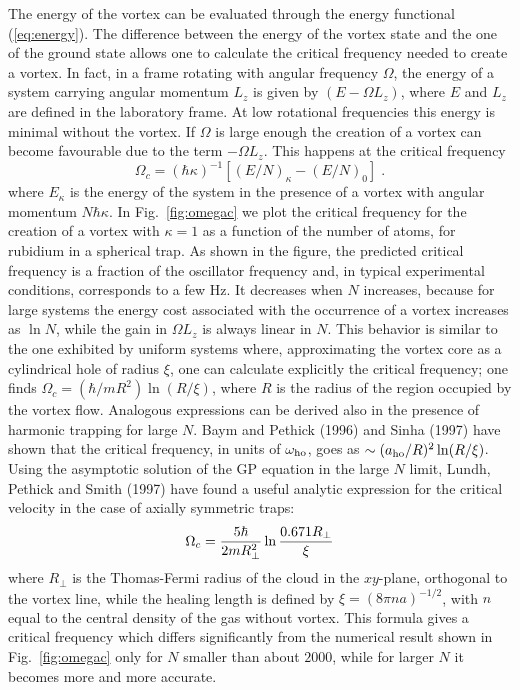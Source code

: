 The energy of the vortex can be evaluated through the energy functional
(\ref{eq:energy}). The difference between the energy of the vortex state
and the one of the ground state allows one to calculate the critical
frequency needed to create a vortex. In fact, in a frame rotating with
angular frequency $\Omega$, the energy of a system carrying angular
momentum $L_z$ is given by $(E-\Omega L_z)$, where $E$ and $L_z$ are
defined in the laboratory frame. At low rotational frequencies this
energy is minimal without the vortex. If $\Omega$ is large enough the
creation of a vortex can become favourable due to the term  $-\Omega L_z$.
This happens at the critical frequency
\begin{equation}
\Omega_c = (\hbar\kappa)^{-1} [(E/N)_{\kappa}-(E/N)_0] \;.
\label{eq:vorcf}
\end{equation}
where $E_{\kappa}$ is the energy of the system in the presence of a
vortex with angular momentum $N\hbar{\kappa}$. In Fig.~\ref{fig:omegac}
we plot the critical frequency for the creation of a vortex with 
$\kappa=1$ as a function of the number of atoms, for rubidium in
a spherical trap. As shown in the figure, the predicted critical 
frequency is a fraction of the oscillator frequency and, in typical 
experimental conditions, corresponds to a few Hz. It decreases when 
$N$ increases, because for large systems the energy cost associated 
with the occurrence of a vortex increases as $\ln N$, while the gain 
in $\Omega L_z$ is always linear in $N$. This behavior is similar 
to the one exhibited by uniform systems where, approximating  the 
vortex core  as a cylindrical hole of radius  $\xi$, one can  
calculate explicitly the critical frequency; one finds
$\Omega_c = (\hbar/mR^2)\ln (R/\xi)$, where $R$ is the radius of the
region occupied by the vortex flow. Analogous expressions can be derived 
also in the presence of harmonic trapping for large $N$.
Baym and Pethick (1996) and Sinha (1997) have shown that the critical
frequency, in units of $\omega_{\rm ho}$, goes as $\sim (a_{\rm ho}/R)^2
\ln(R/\xi)$. Using the asymptotic solution of the GP equation in the
large $N$ limit, Lundh, Pethick and Smith (1997) have found a useful 
analytic expression for the critical velocity in the case of axially 
symmetric traps:
\begin{equation}
\Omega_c = {5 \hbar \over 2 m R_\perp^2 } \ln {0.671 R_\perp \over \xi}
\label{eq:lundh}
\end{equation}
where $R_\perp$ is the Thomas-Fermi radius of the cloud in the $xy$-plane, 
orthogonal to the vortex line, while the healing length is defined by
$\xi = (8\pi n a)^{-1/2}$, with $n$ equal to the central density of the
gas without vortex. This formula gives a critical frequency 
which differs significantly from the numerical result shown in 
Fig.~\ref{fig:omegac} only for $N$ smaller than about $2000$, while
for larger $N$ it becomes more and more accurate. 


